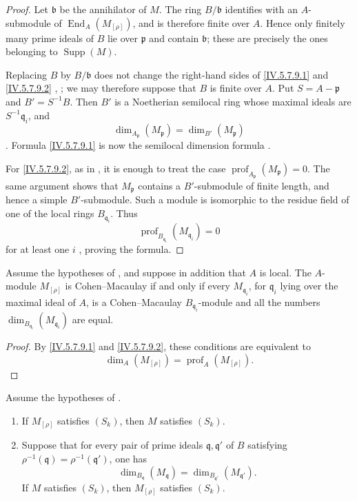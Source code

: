 \begin{proof}
Let $\mathfrak b$ be the annihilator of $M$.  The ring
$B/\mathfrak b$ identifies with an $A$-submodule of
$\operatorname{End}_A(M_{[\rho]})$, and is therefore finite over
$A$.  Hence only finitely many prime ideals of $B$ lie over
$\mathfrak p$ and contain $\mathfrak b$; these are precisely the
ones belonging to $\operatorname{Supp}(M)$.

Replacing $B$ by $B/\mathfrak b$ does not change the right-hand
sides of \eqref{IV.5.7.9.1} and \eqref{IV.5.7.9.2}
, ; we may therefore suppose
that $B$ is finite over $A$.  Put $S=A-\mathfrak p$ and
$B'=S^{-1}B$.  Then $B'$ is a Noetherian semilocal ring whose
maximal ideals are $S^{-1}\mathfrak q_i$, and
\[
\dim_{A_{\mathfrak p}}(M_{\mathfrak p})
 =\dim_{B'}(M_{\mathfrak p})
\]
.  Formula \eqref{IV.5.7.9.1} is now the
semilocal dimension formula .

For \eqref{IV.5.7.9.2}, as in , it is enough to
treat the case
$\operatorname{prof}_{A_{\mathfrak p}}(M_{\mathfrak p})=0$.  The
same argument shows that $M_{\mathfrak p}$ contains a
$B'$-submodule of finite length, and hence a simple
$B'$-submodule.  Such a module is isomorphic to the residue field
of one of the local rings $B_{\mathfrak q_i}$.  Thus
\[
\operatorname{prof}_{B_{\mathfrak q_i}}(M_{\mathfrak q_i})=0
\]
for at least one $i$ , proving the formula.
\end{proof}

\begin{corollary}[5.7.10]
\label{IV.5.7.10}
Assume the hypotheses of , and suppose in addition
that $A$ is local.  The $A$-module $M_{[\rho]}$ is Cohen--Macaulay
if and only if every $M_{\mathfrak q_i}$, for
$\mathfrak q_i$ lying over the maximal ideal of $A$, is a
Cohen--Macaulay $B_{\mathfrak q_i}$-module and all the numbers
$\dim_{B_{\mathfrak q_i}}(M_{\mathfrak q_i})$ are equal.
\end{corollary}

\begin{proof}
By \eqref{IV.5.7.9.1} and \eqref{IV.5.7.9.2}, these conditions are
equivalent to
\[
\dim_A(M_{[\rho]})
 =\operatorname{prof}_A(M_{[\rho]}).
\]
\end{proof}

\begin{corollary}[5.7.11]
\label{IV.5.7.11}
Assume the hypotheses of .
\begin{enumerate}[{\rm(i)}]
\item
{}
\label{IV.5.7.11.i}
If $M_{[\rho]}$ satisfies $(S_k)$, then $M$ satisfies $(S_k)$.

\item
{}
\label{IV.5.7.11.ii}
Suppose that for every pair of prime ideals
$\mathfrak q,\mathfrak q'$ of $B$ satisfying
$\rho^{-1}(\mathfrak q)=\rho^{-1}(\mathfrak q')$, one has
\[
\dim_{B_{\mathfrak q}}(M_{\mathfrak q})
 =\dim_{B_{\mathfrak q'}}(M_{\mathfrak q'}).
\]
If $M$ satisfies $(S_k)$, then $M_{[\rho]}$ satisfies $(S_k)$.
\end{enumerate}
\end{corollary}

